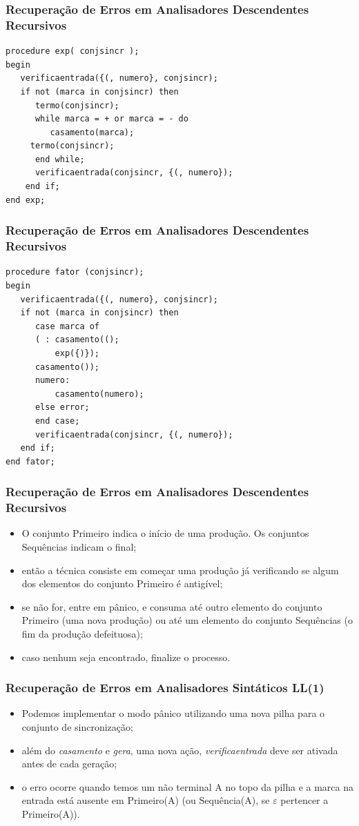 \documentclass[table]{beamer}
\begin{document}
\begin{frame}[fragile]
   \frametitle{Recuperação de Erros em Analisadores Descendentes Recursivos}
   \begin{verbatim}
procedure exp( conjsincr );
begin
   verificaentrada({(, numero}, conjsincr);
   if not (marca in conjsincr) then
      termo(conjsincr);
      while marca = + or marca = - do
         casamento(marca);
	 termo(conjsincr); 
      end while;
      verificaentrada(conjsincr, {(, numero});
    end if;
end exp;
   \end{verbatim}
\end{frame}

\begin{frame}[fragile]
   \frametitle{Recuperação de Erros em Analisadores Descendentes Recursivos}
   \begin{verbatim}
procedure fator (conjsincr);
begin
   verificaentrada({(, numero}, conjsincr);
   if not (marca in conjsincr) then
      case marca of
      ( : casamento(();
          exp({)});
	  casamento());
      numero:
          casamento(numero);
      else error;
      end case;
      verificaentrada(conjsincr, {(, numero});
   end if;
end fator;
   \end{verbatim}
\end{frame}

\begin{frame}[fragile]
   \frametitle{Recuperação de Erros em Analisadores Descendentes Recursivos}
   \begin{itemize}
      \item O conjunto Primeiro indica o início de uma produção. Os conjuntos Sequências indicam o final;
      \item então a técnica consiste em começar uma produção já verificando se algum dos elementos do conjunto Primeiro é antigível;
      \item se não for, entre em pânico, e consuma até outro elemento do conjunto Primeiro (uma nova produção) ou até um elemento do conjunto Sequências (o fim da produção defeituosa);
      \item caso nenhum seja encontrado, finalize o processo.
   \end{itemize}
\end{frame}

\begin{frame}
   \frametitle{Recuperação de Erros em Analisadores Sintáticos LL(1)}
   \begin{itemize}
      \item Podemos implementar o modo pânico utilizando uma nova pilha para o conjunto de sincronização;
      \item além do \textit{casamento} e \textit{gera}, uma nova ação, \textit{verificaentrada} deve ser ativada antes de cada geração;
      \item o erro ocorre quando temos um não terminal A no topo da pilha e a marca na entrada está ausente em Primeiro(A) (ou Sequência(A), se $\varepsilon$ pertencer a Primeiro(A)).
   \end{itemize}
\end{frame}
\end{document}
